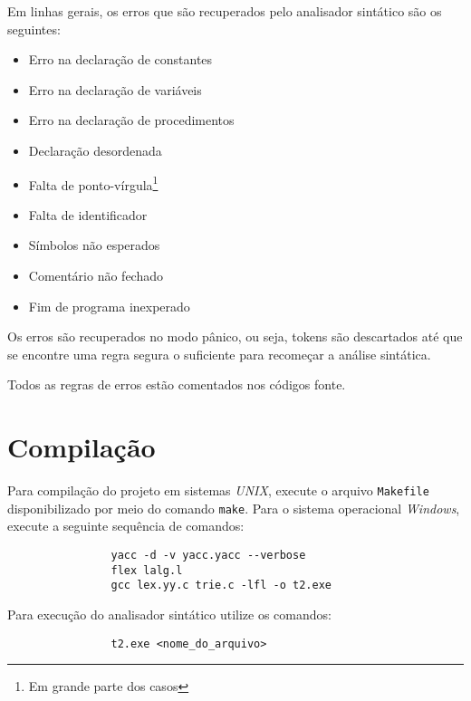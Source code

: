 \documentclass {article}
\begin{document}
		Em linhas gerais, os erros que são recuperados pelo analisador sintático são os seguintes:
		
		\begin{itemize}
			\item Erro na declaração de constantes
			\item Erro na declaração de variáveis
			\item Erro na declaração de procedimentos
			\item Declaração desordenada 
			\item Falta de ponto-vírgula\footnote{Em grande parte dos casos}
			\item Falta de identificador
			\item Símbolos não esperados
			\item Comentário não fechado
			\item Fim de programa inexperado
		\end{itemize}

		Os erros são recuperados no modo pânico, ou seja, tokens são descartados até que se encontre uma regra segura o suficiente para recomeçar a análise sintática.	

		Todos as regras de erros estão comentados nos códigos fonte.


\section{Compilação}\label{section:compilacao}
	Para compilação do projeto em sistemas \emph{UNIX}, execute o arquivo \verb=Makefile= disponibilizado por meio do comando \verb=make=. Para o sistema operacional \emph{Windows}, execute a seguinte sequência de comandos:

	\begin{center}
		\begin{minipage}[ht]{0.5\textwidth}
			\begin{verbatim}
				yacc -d -v yacc.yacc --verbose 
				flex lalg.l
				gcc lex.yy.c trie.c -lfl -o t2.exe
			\end{verbatim}
		\end{minipage}
	\end{center}

	Para execução do analisador sintático utilize os comandos:

	\begin{center}
		\begin{minipage}[ht]{0.5\textwidth}
			\begin{verbatim}
				t2.exe <nome_do_arquivo>
			\end{verbatim}
		\end{minipage}
	\end{center}
\end{document}
